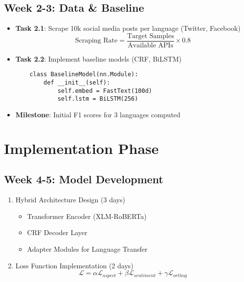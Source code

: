 \documentclass[]{article}
\begin{document}
\subsection*{Week 2-3: Data \& Baseline}
\begin{itemize}
    \item \textbf{Task 2.1}: Scrape 10k social media posts per language (Twitter, Facebook)
    \begin{equation*}
    \text{Scraping Rate} = \frac{\text{Target Samples}}{\text{Available APIs}} \times 0.8
    \end{equation*}

    \item \textbf{Task 2.2}: Implement baseline models (CRF, BiLSTM)
    \begin{verbatim}
    class BaselineModel(nn.Module):
        def __init__(self):
            self.embed = FastText(100d)
            self.lstm = BiLSTM(256)
    \end{verbatim}

    \item \textbf{Milestone}: Initial F1 scores for 3 languages computed
\end{itemize}

\section{Implementation Phase}
\subsection*{Week 4-5: Model Development}
\begin{enumerate}
    \item Hybrid Architecture Design (3 days)
    \begin{itemize}
        \item Transformer Encoder (XLM-RoBERTa)
        \item CRF Decoder Layer
        \item Adapter Modules for Language Transfer
    \end{itemize}

    \item Loss Function Implementation (2 days)
    \begin{equation}
    \mathcal{L} = \alpha\mathcal{L}_{aspect} + \beta\mathcal{L}_{sentiment} + \gamma\mathcal{L}_{orthog}
    \end{equation}
\end{enumerate}
\end{document}
